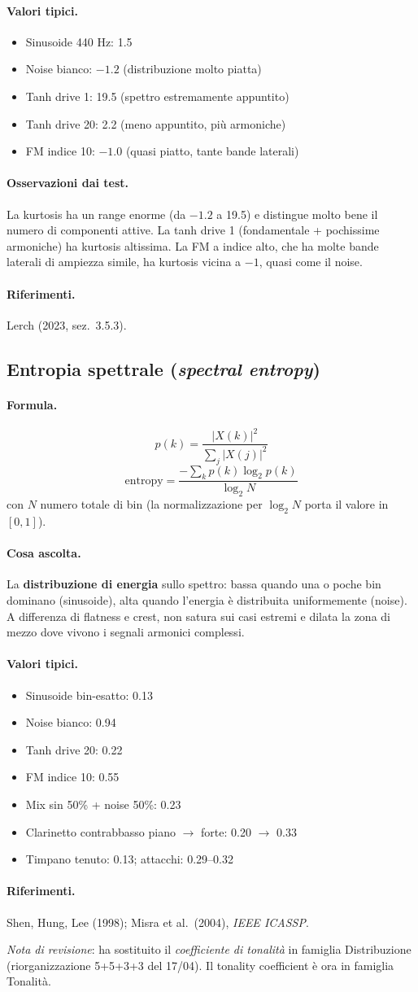\documentclass[a4paper,11pt]{article}
\newcommand{\desc}[1]{\subsection{#1}}
\newcommand{\formula}{\paragraph{Formula.}}
\newcommand{\ascolta}{\paragraph{Cosa ascolta.}}
\newcommand{\range}{\paragraph{Valori tipici.}}
\newcommand{\rif}{\paragraph{Riferimenti.}}
\newcommand{\oss}{\paragraph{Osservazioni dai test.}}
\begin{document}
\range
\begin{itemize}[nosep]
  \item Sinusoide 440 Hz: 1.5
  \item Noise bianco: $-1.2$ (distribuzione molto piatta)
  \item Tanh drive 1: 19.5 (spettro estremamente appuntito)
  \item Tanh drive 20: 2.2 (meno appuntito, più armoniche)
  \item FM indice 10: $-1.0$ (quasi piatto, tante bande laterali)
\end{itemize}

\oss La kurtosis ha un range enorme (da $-1.2$ a 19.5) e distingue
molto bene il numero di componenti attive. La tanh drive 1
(fondamentale + pochissime armoniche) ha kurtosis altissima.
La FM a indice alto, che ha molte bande laterali di ampiezza simile,
ha kurtosis vicina a $-1$, quasi come il noise.

\rif Lerch (2023, sez.~3.5.3).

\desc{Entropia spettrale (\emph{spectral entropy})}

\formula
\[
  p(k) = \frac{|X(k)|^2}{\sum_j |X(j)|^2}
\]
\[
  \text{entropy} = \frac{-\sum_k p(k) \log_2 p(k)}{\log_2 N}
\]
con $N$ numero totale di bin (la normalizzazione per $\log_2 N$ porta
il valore in $[0,1]$).

\ascolta
La \textbf{distribuzione di energia} sullo spettro: bassa quando una o
poche bin dominano (sinusoide), alta quando l'energia è distribuita
uniformemente (noise). A differenza di flatness e crest, non satura
sui casi estremi e dilata la zona di mezzo dove vivono i segnali
armonici complessi.

\range
\begin{itemize}[nosep]
  \item Sinusoide bin-esatto: 0.13
  \item Noise bianco: 0.94
  \item Tanh drive 20: 0.22
  \item FM indice 10: 0.55
  \item Mix sin 50\% + noise 50\%: 0.23
  \item Clarinetto contrabbasso piano $\to$ forte: 0.20 $\to$ 0.33
  \item Timpano tenuto: 0.13; attacchi: 0.29--0.32
\end{itemize}

\rif Shen, Hung, Lee (1998); Misra et al.\ (2004), \emph{IEEE ICASSP}.

\bigskip
\noindent\textit{Nota di revisione}: ha sostituito il \emph{coefficiente
di tonalità} in famiglia Distribuzione (riorganizzazione 5+5+3+3 del
17/04). Il tonality coefficient è ora in famiglia Tonalità.
\end{document}

